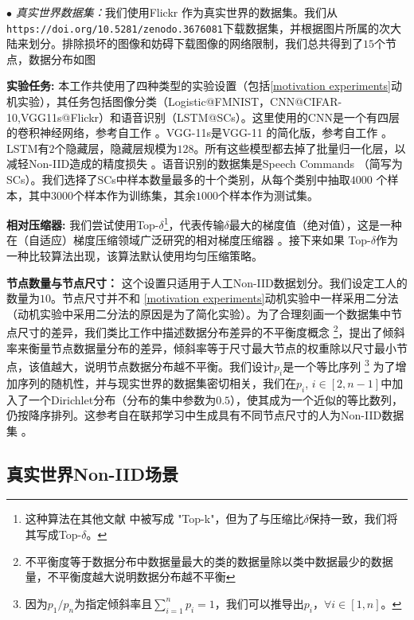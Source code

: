 \noindent$\bullet$  \textit{真实世界数据集：}我们使用Flickr \cite{niid2020icml}作为真实世界的数据集。我们从\texttt{https://doi.org/10.5281/zenodo.3676081}下载数据集，并根据图片所属的次大陆来划分。排除损坏的图像和妨碍下载图像的网络限制，我们总共得到了$15$个节点，数据分布如图

\noindent \textbf{实验任务:} 本工作共使用了四种类型的实验设置（包括\ref{motivation experiments}动机实验），其任务包括图像分类（Logistic@FMNIST，CNN@CIFAR-10,VGG11s@Flickr）和语音识别（LSTM@SCs）。这里使用的CNN是一个有四层的卷积神经网络，参考自工作 \cite{fed_learning}。VGG-11s是VGG-11  \cite{vgg}的简化版，参考自工作 \cite{sbc} 。LSTM有$2$个隐藏层，隐藏层规模为$128$。所有这些模型都去掉了批量归一化层，以减轻Non-IID造成的精度损失 \cite{niid2020icml}。语音识别的数据集是Speech Commands \cite{warden2018speech}（简写为SCs）。我们选择了SCs中样本数量最多的十个类别，从每个类别中抽取$4000$ 个样本，其中$3000$个样本作为训练集，其余$1000$个样本作为测试集。


\noindent \textbf{相对压缩器:} 我们尝试使用Top-$\delta$\footnote{这种算法在其他文献 \cite{aji2017sparse,alistarh2018convergence}中被写成 "Top-k"，但为了与压缩比$\delta$保持一致，我们将其写成Top-$\delta$。 }，代表传输$\delta$最大的梯度值（绝对值），这是一种在（自适应）梯度压缩领域广泛研究的相对梯度压缩器 \cite{hardthreshold,accordion,stich2019error}。接下来如果 Top-$\delta$作为一种比较算法出现，该算法默认使用均匀压缩策略。

\noindent \textbf{节点数量与节点尺寸：}   这个设置只适用于人工Non-IID数据划分。我们设定工人的数量为$10$。节点尺寸并不和 \ref{motivation experiments}动机实验中一样采用二分法（动机实验中采用二分法的原因是为了简化实验）。为了合理刻画一个数据集中节点尺寸的差异，我们类比工作\cite{longtail}中描述数据分布差异的不平衡度概念 \footnote{不平衡度等于数据分布中数据量最大的类的数据量除以类中数据最少的数据量，不平衡度越大说明数据分布越不平衡}，提出了倾斜率来衡量节点数据量分布的差异，倾斜率等于尺寸最大节点的权重除以尺寸最小节点，该值越大，说明节点数据分布越不平衡。我们设计$p_i$是一个等比序列 \footnote{因为$p_1/p_n$为指定倾斜率且$\sum_{i=1}^n p_i=1$，我们可以推导出$p_i$，$\forall i \in [1,n]$。} 为了增加序列的随机性，并与现实世界的数据集密切相关，我们在$p_i$, $i \in [2,n-1]$中加入了一个Dirichlet分布（分布的集中参数为$0.5$），使其成为一个近似的等比数列，仍按降序排列。这参考自在联邦学习中生成具有不同节点尺寸的人为Non-IID数据集 \cite{niidbench,wang2020tackling}。


\subsection{真实世界Non-IID场景}


